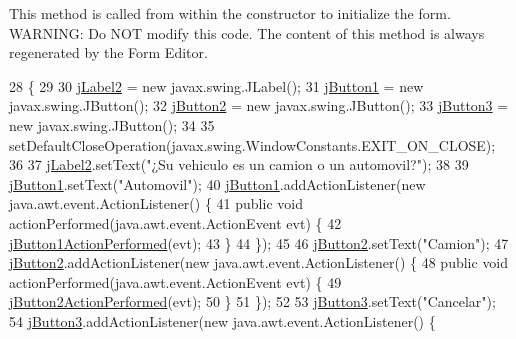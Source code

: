 This method is called from within the constructor to initialize the form. W\+A\+R\+N\+I\+NG\+: Do N\+OT modify this code. The content of this method is always regenerated by the Form Editor. 
\begin{DoxyCode}
28                                   \{
29 
30         \mbox{\hyperlink{classejercicio2_1_1_interfaz2_afed2016c320d66b58d4790add9b28196}{jLabel2}} = \textcolor{keyword}{new} javax.swing.JLabel();
31         \mbox{\hyperlink{classejercicio2_1_1_interfaz2_a949e47628600917db7a23e8578a15ac6}{jButton1}} = \textcolor{keyword}{new} javax.swing.JButton();
32         \mbox{\hyperlink{classejercicio2_1_1_interfaz2_a93c88ef914c8fc9608562eeb7332ba29}{jButton2}} = \textcolor{keyword}{new} javax.swing.JButton();
33         \mbox{\hyperlink{classejercicio2_1_1_interfaz2_a777b07babdd7af4ba93aeb3046529a34}{jButton3}} = \textcolor{keyword}{new} javax.swing.JButton();
34 
35         setDefaultCloseOperation(javax.swing.WindowConstants.EXIT\_ON\_CLOSE);
36 
37         \mbox{\hyperlink{classejercicio2_1_1_interfaz2_afed2016c320d66b58d4790add9b28196}{jLabel2}}.setText(\textcolor{stringliteral}{"¿Su vehiculo es un camion o un automovil?"});
38 
39         \mbox{\hyperlink{classejercicio2_1_1_interfaz2_a949e47628600917db7a23e8578a15ac6}{jButton1}}.setText(\textcolor{stringliteral}{"Automovil"});
40         \mbox{\hyperlink{classejercicio2_1_1_interfaz2_a949e47628600917db7a23e8578a15ac6}{jButton1}}.addActionListener(\textcolor{keyword}{new} java.awt.event.ActionListener() \{
41             \textcolor{keyword}{public} \textcolor{keywordtype}{void} actionPerformed(java.awt.event.ActionEvent evt) \{
42                 \mbox{\hyperlink{classejercicio2_1_1_interfaz2_a615dc098c291d5ae182d63fedd6b030d}{jButton1ActionPerformed}}(evt);
43             \}
44         \});
45 
46         \mbox{\hyperlink{classejercicio2_1_1_interfaz2_a93c88ef914c8fc9608562eeb7332ba29}{jButton2}}.setText(\textcolor{stringliteral}{"Camion"});
47         \mbox{\hyperlink{classejercicio2_1_1_interfaz2_a93c88ef914c8fc9608562eeb7332ba29}{jButton2}}.addActionListener(\textcolor{keyword}{new} java.awt.event.ActionListener() \{
48             \textcolor{keyword}{public} \textcolor{keywordtype}{void} actionPerformed(java.awt.event.ActionEvent evt) \{
49                 \mbox{\hyperlink{classejercicio2_1_1_interfaz2_a3eb4f2b32d3fd61ab73e7fa5e272d9ef}{jButton2ActionPerformed}}(evt);
50             \}
51         \});
52 
53         \mbox{\hyperlink{classejercicio2_1_1_interfaz2_a777b07babdd7af4ba93aeb3046529a34}{jButton3}}.setText(\textcolor{stringliteral}{"Cancelar"});
54         \mbox{\hyperlink{classejercicio2_1_1_interfaz2_a777b07babdd7af4ba93aeb3046529a34}{jButton3}}.addActionListener(\textcolor{keyword}{new} java.awt.event.ActionListener() \{

\end{DoxyCode}
